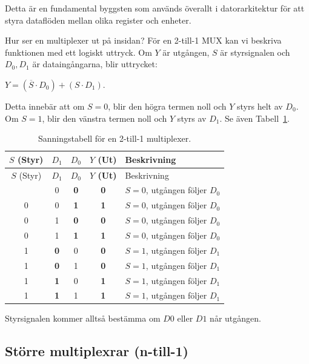 \documentclass[
  swedish,
  letterpaper,
  oneside,
  openany]{book}
\begin{document}
Detta är en fundamental byggsten som används överallt i datorarkitektur
för att styra dataflöden mellan olika register och enheter.

Hur ser en multiplexer ut på insidan? För en 2-till-1 MUX kan vi
beskriva funktionen med ett logiskt uttryck. Om \(Y\) är utgången, \(S\)
är styrsignalen och \(D_0, D_1\) är dataingångarna, blir uttrycket:

\(Y = (\overline{S} \cdot D_0) + (S \cdot D_1)\).

Detta innebär att om \(S=0\), blir den högra termen noll och \(Y\) styrs
helt av \(D_0\). Om \(S=1\), blir den vänstra termen noll och \(Y\)
styrs av \(D_1\). Se även Tabell~\ref{tbl-2-to-1-multiplexer}.

\begin{longtable}[]{@{}ccccl@{}}
\caption{Sanningstabell för en 2-till-1
multiplexer.}\label{tbl-2-to-1-multiplexer}\tabularnewline
\toprule\noalign{}
\(S\) (Styr) & \(D_1\) & \(D_0\) & \textbf{\(Y\) (Ut)} & Beskrivning \\
\midrule\noalign{}
\endfirsthead
\toprule\noalign{}
\(S\) (Styr) & \(D_1\) & \(D_0\) & \textbf{\(Y\) (Ut)} & Beskrivning \\
\midrule\noalign{}
\endhead
\bottomrule\noalign{}
\endlastfoot
0 & 0 & \textbf{0} & \textbf{0} & \(S=0\), utgången följer \(D_0\) \\
0 & 0 & \textbf{1} & \textbf{1} & \(S=0\), utgången följer \(D_0\) \\
0 & 1 & \textbf{0} & \textbf{0} & \(S=0\), utgången följer \(D_0\) \\
0 & 1 & \textbf{1} & \textbf{1} & \(S=0\), utgången följer \(D_0\) \\
1 & \textbf{0} & 0 & \textbf{0} & \(S=1\), utgången följer \(D_1\) \\
1 & \textbf{0} & 1 & \textbf{0} & \(S=1\), utgången följer \(D_1\) \\
1 & \textbf{1} & 0 & \textbf{1} & \(S=1\), utgången följer \(D_1\) \\
1 & \textbf{1} & 1 & \textbf{1} & \(S=1\), utgången följer \(D_1\) \\
\end{longtable}

Styrsignalen kommer alltså bestämma om \(D0\) eller \(D1\) når utgången.

\subsection{Större multiplexrar
(n-till-1)}\label{sec-n-till-1-multiplexer}
\end{document}
